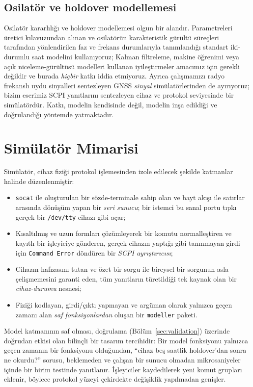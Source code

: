 \documentclass[9pt,twocolumn,a4paper]{extarticle}
\begin{document}
\subsection{Osilatör ve holdover modellemesi}
Osilatör kararlılığı ve holdover modellemesi olgun bir alandır. Parametreleri üretici kılavuzundan alınan ve osilatörün karakteristik gürültü süreçleri~\cite{zucca2005clock} tarafından yönlendirilen faz ve frekans durumlarıyla tanımlandığı standart iki-durumlu saat modelini kullanıyoruz; Kalman filtreleme, makine öğrenimi veya açık niceleme-gürültüsü modelleri kullanan iyileştirmeler amacımız için gerekli değildir ve burada \emph{hiçbir} katkı iddia etmiyoruz. Ayrıca çalışmamızı radyo frekanslı uydu sinyalleri sentezleyen GNSS \emph{sinyal} simülatörlerinden de ayırıyoruz; bizim eserimiz SCPI yanıtlarını sentezleyen cihaz ve protokol seviyesinde bir simülatördür. Katkı, modelin kendisinde değil, modelin inşa edildiği ve doğrulandığı yöntemde yatmaktadır.

\section{Simülatör Mimarisi}
\label{sec:arch}
Simülatör, cihaz fiziği protokol işlemesinden izole edilecek şekilde katmanlar halinde düzenlenmiştir:
\begin{itemize}
\item \texttt{socat} ile oluşturulan bir sözde-terminale sahip olan ve bayt akışı ile satırlar arasında dönüşüm yapan bir \emph{seri sunucu}; bir istemci bu sanal portu tıpkı gerçek bir \texttt{/dev/tty} cihazı gibi açar;
\item Kısaltılmış ve uzun formları çözümleyerek bir komutu normalleştiren ve kayıtlı bir işleyiciye gönderen, gerçek cihazın yaptığı gibi tanınmayan girdi için \texttt{Command Error} döndüren bir \emph{SCPI ayrıştırıcısı};
\item Cihazın hafızasını tutan ve özet bir sorgu ile bireysel bir sorgunun asla çelişmemesini garanti eden, tüm yanıtların türetildiği tek kaynak olan bir \emph{cihaz-durumu} nesnesi;
\item Fiziği kodlayan, girdi/çıktı yapmayan ve argüman olarak yalnızca geçen zamanı alan \emph{saf fonksiyonlardan} oluşan bir \texttt{modeller} paketi.
\end{itemize}
Model katmanının saf olması, doğrulama (Bölüm~\ref{sec:validation}) üzerinde doğrudan etkisi olan bilinçli bir tasarım tercihidir: Bir model fonksiyonu yalnızca geçen zamanın bir fonksiyonu olduğundan, ``cihaz beş saatlik holdover'dan sonra ne okurdu?'' sorusu, beklemeden ve çalışan bir sunucu olmadan mikrosaniyeler içinde bir birim testinde yanıtlanır. İşleyiciler kaydedilerek yeni komut grupları eklenir, böylece protokol yüzeyi çekirdekte değişiklik yapılmadan genişler.
\end{document}
